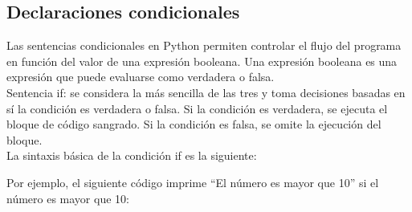 \subsection{Declaraciones condicionales}
Las sentencias condicionales en Python permiten controlar el flujo del programa en función del valor de una expresión booleana. Una expresión booleana es una expresión que puede evaluarse como verdadera o falsa.\\

Sentencia if: se considera la más sencilla de las tres y toma decisiones basadas en sí la condición es verdadera o falsa. Si la condición es verdadera, se ejecuta el bloque de código sangrado. Si la condición es falsa, se omite la ejecución del bloque.\\

La sintaxis básica de la condición if es la siguiente:
\begin{figure}[h]
    \centering
  \end{figure}
\newpage
Por ejemplo, el siguiente código imprime ``El número es mayor que 10'' si el número es mayor que 10:

\begin{figure}[h]
    \centering
  \end{figure}

